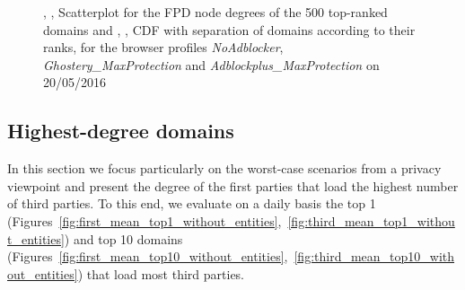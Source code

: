 \begin{figure}
  \hfill
 
 \caption{\protect{}, \protect{}, \protect{} Scatterplot for the FPD node degrees of the 500 top-ranked domains and \protect{}, \protect{}, \protect{} CDF with separation of domains according to their ranks, for the browser profiles \textit{NoAdblocker}, \textit{Ghostery\_\allowbreak MaxProtection} and \textit{Adblockplus\_\allowbreak MaxProtection} on 20/05/2016}
 \label{fig:first_node_degree}
\end{figure}

\subsection{Highest-degree domains}
In this section we focus particularly on the worst-case scenarios from a privacy viewpoint and present the degree of the first parties that load the highest number of third parties. To this end, we evaluate on a daily basis the top 1 (Figures~\ref{fig:first_mean_top1_without_entities},~\ref{fig:third_mean_top1_without_entities}) and top 10 domains (Figures~\ref{fig:first_mean_top10_without_entities},~\ref{fig:third_mean_top10_without_entities}) that load most third parties.

